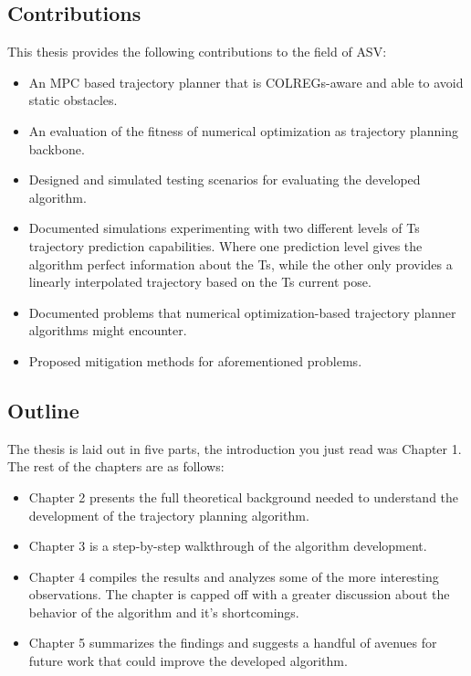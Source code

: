 \subsection{Contributions}
This thesis provides the following contributions to the field of \gls{ASV}:
\begin{itemize}
    \item An MPC based trajectory planner that is COLREGs-aware and able to avoid static obstacles.
    \item An evaluation of the fitness of numerical optimization as trajectory planning backbone.
    \item Designed and simulated testing scenarios for evaluating the developed algorithm.
    \item Documented simulations experimenting with two different levels of \gls{Ts} trajectory prediction capabilities. Where one prediction level
    gives the algorithm perfect information about the \gls{Ts}, while the other only provides a linearly interpolated trajectory based on the \gls{Ts} current pose.
    \item Documented problems that numerical optimization-based trajectory planner algorithms might encounter.
    \item Proposed mitigation methods for aforementioned problems.
\end{itemize}

\subsection{Outline}
The thesis is laid out in five parts, the introduction you just read was Chapter 1. The rest of the chapters are as follows:
\begin{itemize}
    \item Chapter 2 presents the full theoretical background needed to understand the development of the trajectory planning algorithm.
    \item Chapter 3 is a step-by-step walkthrough of the algorithm development.
    \item Chapter 4 compiles the results and analyzes some of the more interesting observations. The chapter is capped off with a greater
    discussion about the behavior of the algorithm and it's shortcomings.
    \item Chapter 5 summarizes the findings and suggests a handful of avenues for future work that could improve the developed algorithm.
\end{itemize}


\newpage